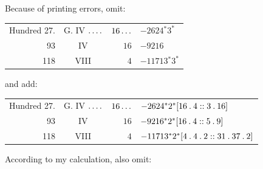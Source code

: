 \par{}Because of printing errors, omit:
\begin{longtable}{rcrl}
Hundred 27. & G. IV $\mathinner{.\,.\,.\,.}$ & $16\mathinner{.\,.\,.}$ & $-2624{}^{*}3^{*}$ \\
93 & IV & $16$ & $-9216$ \\
118 & VIII & $4$ & $-11713{}^{*}3^{*}$ \\
\end{longtable}
\par{}and add:
\begin{longtable}{rcrl}
Hundred 27. & G. IV $\mathinner{.\,.\,.\,.}$ & $16\mathinner{.\,.\,.}$ & $-2624{}^{*}2^{*}[16\mathbin{.}4::3\mathbin{.}16]$ \\
93 & IV & $16$ & $-9216{}^{*}2^{*}[16\mathbin{.}4::5\mathbin{.}9]$ \\
118 & VIII & $4$ & $-11713{}^{*}2^{*}[4\mathbin{.}4\mathbin{.}2::31\mathbin{.}37\mathbin{.}2]$ \\
\end{longtable}
\par{}According to my calculation, also omit:
